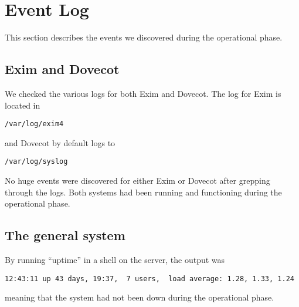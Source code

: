 
\section{Event Log}
This section describes the events we discovered during the operational
phase.
\subsection{Exim and Dovecot}
We checked the various logs for both Exim and Dovecot. The log for Exim
is located in \begin{verbatim}/var/log/exim4\end{verbatim} and Dovecot
by default logs to \begin{verbatim}/var/log/syslog\end{verbatim}

No huge events were discovered for either Exim or Dovecot after
grepping through the logs. Both systems had been running and functioning
during the operational phase.
\subsection{The general system}
By running ``uptime'' in a shell on the server, the output was
\begin{verbatim}12:43:11 up 43 days, 19:37,  7 users,  load average: 1.28, 1.33, 1.24\end{verbatim}
meaning that the system had not been down during the operational phase.

